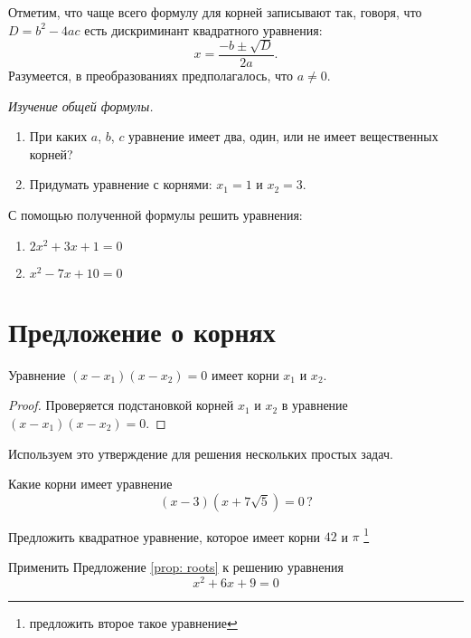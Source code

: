 \documentclass[11pt,fleqn]{book} %
\begin{document}
Отметим, что чаще всего формулу для корней записывают так, говоря, что $\boxed{D = b^2 - 4ac}$ есть дискриминант квадратного уравнения:
$$\boxed{x = \frac{-b \pm \sqrt D}{2a}}.$$
Разумеется, в преобразованиях предполагалось, что $a \neq 0$. 

\begin{problem}
\textit{Изучение общей формулы. }
\begin{enumerate}
\item При каких $a$, $b$, $c$ уравнение имеет два, один, или не имеет вещественных корней?
\item Придумать уравнение с корнями: $x_1 = 1$ и $x_2 =3$.
\end{enumerate}
\end{problem}


\begin{problem}
С помощью полученной формулы решить уравнения:

\begin{enumerate}
\item $2x^2 + 3x  + 1 = 0$
\item $x^2 - 7x + 10 = 0$
\end{enumerate}

\end{problem}

\section{Предложение о корнях}

\begin{proposition}
\label{prop: roots}
Уравнение $(x-x_1)(x-x_2)=0$ имеет корни $x_1$ и $x_2$.
\end{proposition}

\begin{proof}
Проверяется подстановкой корней $x_1$ и $x_2$ в уравнение $(x-x_1)(x-x_2)=0$.
\end{proof}

Используем это утверждение для решения нескольких простых задач.

\begin{problem}
Какие корни имеет уравнение $$(x-3)(x+7\sqrt 5) = 0 \,?$$
\end{problem}
\begin{problem}
Предложить квадратное уравнение, которое имеет корни $42$ и $\pi$ \footnote{предложить второе такое уравнение}
\end{problem}
\begin{problem}
Применить Предложение \ref{prop: roots} к решению уравнения $$x^2 + 6x + 9 = 0$$
\end{problem}
\end{document}
